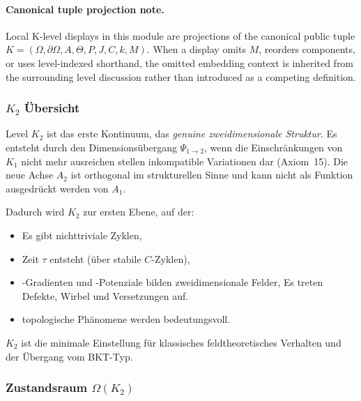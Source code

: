



\paragraph{Canonical tuple projection note.}
Local K-level displays in this module are projections of the canonical public tuple \(K=(\Omega,\partial\Omega,A,\Theta,P,J,C,k,M)\). When a display omits \(M\), reorders components, or uses level-indexed shorthand, the omitted embedding context is inherited from the surrounding level discussion rather than introduced as a competing definition.

\subsubsection{\texorpdfstring{$K_2$}{K_2} Übersicht}
\label{sec:k2-overview}

Level $K_2$ ist das erste Kontinuum, das \emph{genuine
zweidimensionale Struktur}. Es entsteht durch den Dimensionsübergang
$\Psi_{1\to2}$, wenn die Einschränkungen von $K_1$ nicht mehr ausreichen
stellen inkompatible Variationen dar (Axiom~15). Die neue Achse $A_2$ ist
orthogonal im strukturellen Sinne und kann nicht als Funktion ausgedrückt werden
von $A_1$.

Dadurch wird $K_2$ zur ersten Ebene, auf der:
\begin{itemize}
    \item Es gibt nichttriviale Zyklen,
    \item Zeit $\tau$ entsteht (über stabile $C$-Zyklen),
    \item-Gradienten und -Potenziale bilden zweidimensionale Felder,
    Es treten Defekte, Wirbel und Versetzungen auf.
    \item topologische Phänomene werden bedeutungsvoll.
\end{itemize}

$K_2$ ist die minimale Einstellung für klassisches feldtheoretisches Verhalten und
der Übergang vom BKT-Typ.

\subsubsection{Zustandsraum \texorpdfstring{$\Omega(K_2)$}{\Omega(K_2)}}

